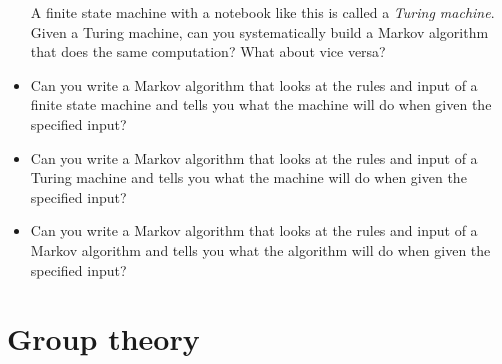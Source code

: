 \documentclass{article}
\newcommand*\proveit{\item[\manimpossiblecube]}
\begin{document}
\begin{itemize}
A finite state machine with a notebook like this is called a {\em Turing machine}. Given a Turing machine, can you systematically build a Markov algorithm that does the same computation? What about vice versa?
\proveit Can you write a Markov algorithm that looks at the rules and input of a finite state machine and tells you what the machine will do when given the specified input?
\proveit Can you write a Markov algorithm that looks at the rules and input of a Turing machine and tells you what the machine will do when given the specified input?
\proveit Can you write a Markov algorithm that looks at the rules and input of a Markov algorithm and tells you what the algorithm will do when given the specified input?
\end{itemize}
\section*{Group theory}
\end{document}
